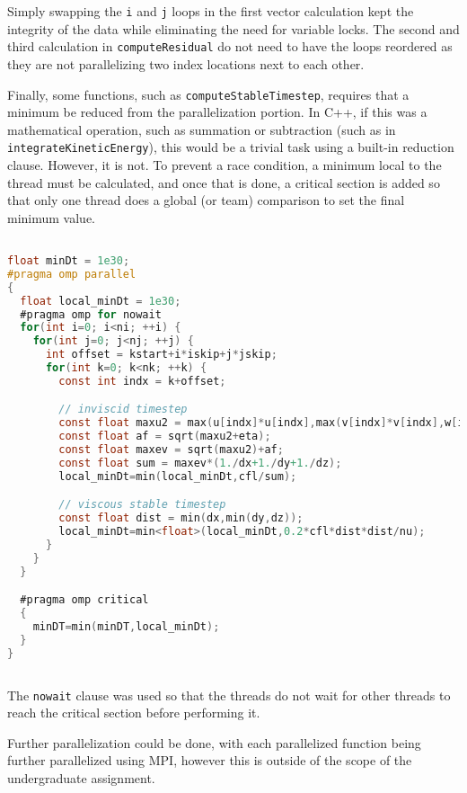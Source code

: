 \documentclass{article}
\begin{document}
  Simply swapping the \verb|i| and \verb|j| loops in the first vector
  calculation kept the integrity of the data while eliminating the need for
  variable locks. The second and third calculation in \verb|computeResidual| do
  not need to have the loops reordered as they are not parallelizing two index
  locations next to each other.

  Finally, some functions, such as \verb|computeStableTimestep|, requires that
  a minimum be reduced from the parallelization portion. In C++, if this was a
  mathematical operation, such as summation or subtraction (such as in
  \verb|integrateKineticEnergy|), this would be a trivial task using a built-in
  reduction clause. However, it is not. To prevent a race condition, a minimum
  local to the thread must be calculated, and once that is done, a critical
  section is added so that only one thread does a global (or team) comparison
  to set the final minimum value.

  \begin{lstlisting}[language=C, linewidth=1\textwidth, breaklines=true]

float minDt = 1e30;
#pragma omp parallel
{
  float local_minDt = 1e30;
  #pragma omp for nowait
  for(int i=0; i<ni; ++i) {
    for(int j=0; j<nj; ++j) {
      int offset = kstart+i*iskip+j*jskip;
      for(int k=0; k<nk; ++k) {
        const int indx = k+offset;

        // inviscid timestep
        const float maxu2 = max(u[indx]*u[indx],max(v[indx]*v[indx],w[indx]*w[indx]));
        const float af = sqrt(maxu2+eta);
        const float maxev = sqrt(maxu2)+af;
        const float sum = maxev*(1./dx+1./dy+1./dz);
        local_minDt=min(local_minDt,cfl/sum);

        // viscous stable timestep
        const float dist = min(dx,min(dy,dz));
        local_minDt=min<float>(local_minDt,0.2*cfl*dist*dist/nu);
      }
    }
  }

  #pragma omp critical
  {
    minDT=min(minDT,local_minDt);
  }
}
    
  \end{lstlisting}

  The \verb|nowait| clause was used so that the threads do not wait for other
  threads to reach the critical section before performing it.

  Further parallelization could be done, with each parallelized function being
  further parallelized using MPI, however this is outside of the scope of the
  undergraduate assignment.
\end{document}
